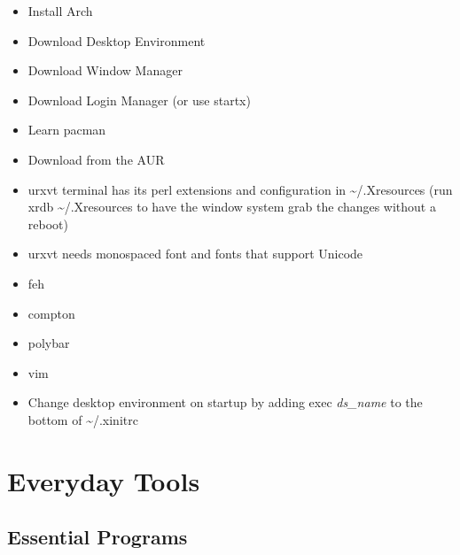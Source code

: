 \begin{itemize}
	\item Install Arch
	\item Download Desktop Environment
	\item Download Window Manager
	\item Download Login Manager (or use startx)
	\item Learn pacman
	\item Download from the AUR
	\item urxvt terminal has its perl extensions and configuration in \textasciitilde/.Xresources (run xrdb \textasciitilde/.Xresources to have the window system grab the changes without a reboot)
	\item urxvt needs monospaced font and fonts that support Unicode
	\item feh
	\item compton
	\item polybar
	\item vim
	\item Change desktop environment on startup by adding exec \textit{ds\_name} to the bottom of \textasciitilde/.xinitrc
\end{itemize}

\toclineskip
\section{Everyday Tools}


\subsection{Essential Programs}





